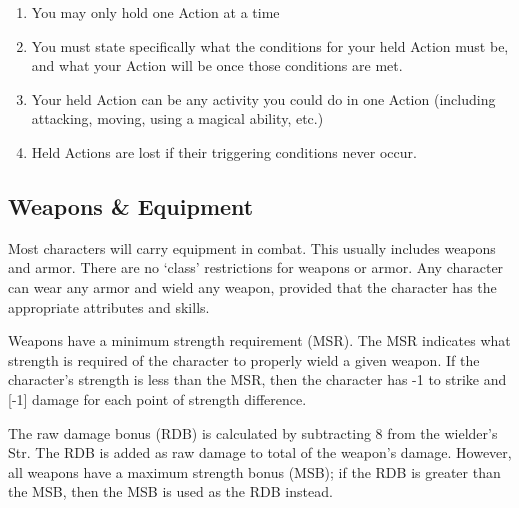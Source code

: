\documentclass[twoside]{book}
\begin{document}
\begin{enumerate}
      
  \item   
              
    {  
     You may only hold one Action at a time 
    }
    
            
  \item   
                
    {  
     You must state specifically what the conditions
                 for your held Action must be, and what your Action will
                 be once those conditions are met. 
    }
  
            
  \item   
                
    {  
     Your held Action can be any activity you could do
                 in one Action (including attacking, moving, using a
                 magical ability, etc.) 
    }
  
            
  \item   
                
    {  
     Held Actions are lost if their triggering
                 conditions never occur. 
    }
  
            
\end{enumerate}
  
    

\subsection{Weapons \& Equipment}
    
    {  
    Most characters will carry equipment in combat. This
               usually includes weapons and armor. There are no
               `class' restrictions for weapons or armor. Any
               character can wear any armor and wield any weapon,
               provided that the character has the appropriate attributes
               and skills. 
    }
  
    {  
    Weapons have a minimum strength requirement (MSR).
               The MSR indicates what strength is required of the
               character to properly wield a given weapon. If the
               character's strength is less than the MSR, then the
               character has -1 to strike and [-1] damage for each point
               of strength difference. 
    }
  
    {  
    The raw damage bonus (RDB) is calculated by
               subtracting 8 from the wielder's Str. The RDB is
               added as raw damage to total of the weapon's damage.
               However, all weapons have a maximum strength bonus (MSB);
               if the RDB is greater than the MSB, then the MSB is used
               as the RDB instead. 
    }
  
\end{document}
